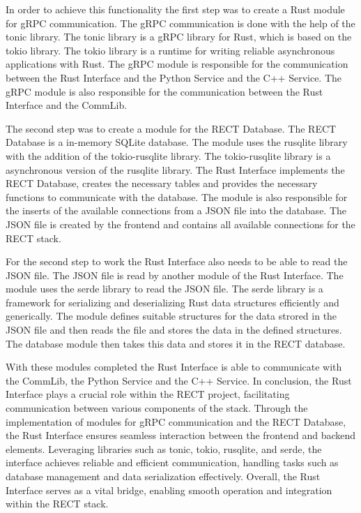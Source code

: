 In order to achieve this functionality the first step was to create a Rust module for gRPC communication. The gRPC communication is done with the help of the tonic library.
The tonic library is a gRPC library for Rust, which is based on the tokio library. The tokio library is a runtime for writing reliable asynchronous applications with Rust.
The gRPC module is responsible for the communication between the Rust Interface and the Python Service and the C++ Service. The gRPC module is also responsible for the 
communication between the Rust Interface and the CommLib.\newline 

The second step was to create a module for the RECT Database. The RECT Database is a in-memory SQLite database. The module uses the rusqlite library with the addition of
the tokio-rusqlite library. The tokio-rusqlite library is a asynchronous version of the rusqlite library. The Rust Interface implements the RECT Database, creates the 
necessary tables and provides the necessary functions to communicate with the database. The module is also responsible for the inserts of the available connections from a
JSON file into the database. The JSON file is created by the frontend and contains all available connections for the RECT stack.\newline

For the second step to work the Rust Interface also needs to be able to read the JSON file. The JSON file is read by another module of the Rust Interface. The module uses
the serde library to read the JSON file. The serde library is a framework for serializing and deserializing Rust data structures efficiently and generically. The module 
defines suitable structures for the data strored in the JSON file and then reads the file and stores the data in the defined structures. The database module then takes
this data and stores it in the RECT database.\newline

With these modules completed the Rust Interface is able to communicate with the CommLib, the Python Service and the C++ Service. In conclusion, the Rust Interface plays a 
crucial role within the RECT project, facilitating communication between various components of the stack. Through the implementation of modules for gRPC communication and 
the RECT Database, the Rust Interface ensures seamless interaction between the frontend and backend elements. Leveraging libraries such as tonic, tokio, rusqlite, and 
serde, the interface achieves reliable and efficient communication, handling tasks such as database management and data serialization effectively. Overall, the Rust 
Interface serves as a vital bridge, enabling smooth operation and integration within the RECT stack.

